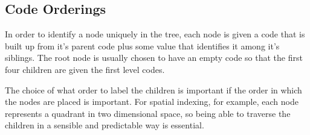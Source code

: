 \subsection{Code Orderings}
\label{sub:code_orderings}

In order to identify a node uniquely in the tree, each node is given a code
that is built up from it's parent code plus some value that identifies it
among it's siblings. The root node is usually chosen to have an empty code so
that the first four children are given the first level codes.

The choice of what order to label the children is important if the order
in which the nodes are placed is important. For spatial indexing, for example,
each node represents a quadrant in two dimensional space, so being able to
traverse the children in a sensible and predictable way is essential.

